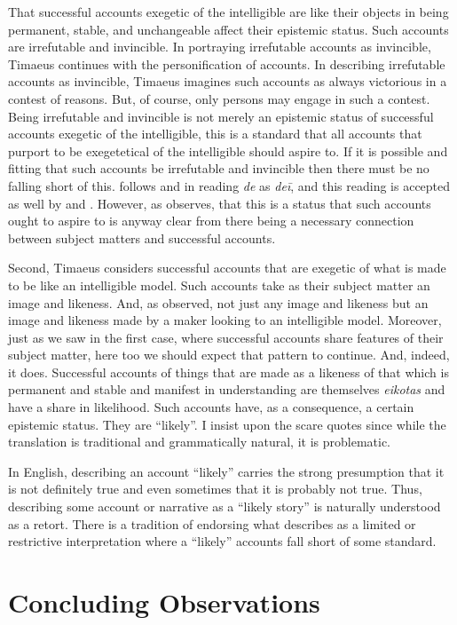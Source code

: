 That successful accounts exegetic of the intelligible are like their objects in being permanent, stable, and unchangeable affect their epistemic status. Such accounts are irrefutable and invincible. In portraying irrefutable accounts as invincible, Timaeus continues with the personification of accounts. In describing irrefutable accounts as invincible, Timaeus imagines such accounts as always victorious in a contest of reasons. But, of course, only persons may engage in such a contest. Being irrefutable and invincible is not merely an epistemic status of successful accounts exegetic of the intelligible, this is a standard that all accounts that purport to be exegetetical of the intelligible should aspire to. If it is possible and fitting that such accounts be irrefutable and invincible then there must be no falling short of this. \citet[150]{Burnyeat:2005it} follows \citet[88]{Archer-Hind:1888qd} and \citet{Burnet:1905oq} in reading \emph{de} as \emph{deī}, and this reading is accepted as well by \citet[74]{Taylor:1928qb} and \citet[52]{Bury:1929jb}. However, as \citet[121 n22]{Bryan:2012bt} observes, that this is a status that such accounts ought to aspire to is anyway clear from there being a necessary connection between subject matters and successful accounts. 

Second, Timaeus considers successful accounts that are exegetic of what is made to be like an intelligible model. Such accounts take as their subject matter an image and likeness. And, as \citet[]{Betegh:2010aa} observed, not just any image and likeness but an image and likeness made by a maker looking to an intelligible model. Moreover, just as we saw in the first case, where successful accounts share features of their subject matter, here too we should expect that pattern to continue. And, indeed, it does. Successful accounts of things that are made as a likeness of that which is permanent and stable and manifest in understanding are themselves \emph{eikotas} and have a share in likelihood. Such accounts have, as a consequence, a certain epistemic status. They are ``likely''. I insist upon the scare quotes since while the translation is traditional and grammatically natural, it is problematic.

In English, describing an account ``likely'' carries the strong presumption that it is not definitely true and even sometimes that it is probably not true. Thus, describing some account or narrative as a ``likely story'' is naturally understood as a retort. There is a tradition of endorsing what \citet[]{Betegh:2010aa} describes as a limited or restrictive interpretation where a ``likely'' accounts fall short of some standard.


\section{Concluding Observations} %
\label{sec:concluding_observations}




